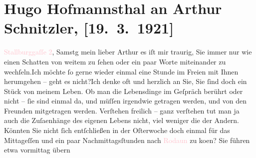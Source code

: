 

               \section[Hugo Hofmannsthal an Arthur Schnitzler, {[}19. 3. 1921{]}]{ Hugo Hofmannsthal an Arthur Schnitzler, {[}19. 3. 1921{]}}\nopagebreak{}\rehead{ }\normalsize\beginnumbering{} \toendnotes[C]{\smallbreak\pagebreak[2]} 
\toendnotes[C]{\smallbreak}\pstart
           \raggedleft{}{\pb}\textcolor{pink}{Stallburggaſſe 2}{}\ledrightnote{\textcolor{pink}{Stallburggasse}}, Samstg\pend
           \pstart{}mein lieber Arthur\pend\pstart
           es iſt mir traurig, Sie immer nur wie einen Schatten von weitem zu ſehen oder ein
               paar Worte miteinander zu wechſeln.\hspace*{1.5em}Ich möchte ſo
               gerne wieder einmal eine Stunde im Freien mit Ihnen herumgehen – geht es nicht?\hspace*{1.5em}Ich denke oft und herzlich an Sie, Sie ſind doch ein
               Stück von meinem Leben. Ob man die Lebensdinge im Geſpräch berührt oder nicht – ſie
               sind einmal {\pb}da, und müſſen
               irgendwie getragen werden, und von den Freunden mitgetragen werden.\pend
           \pstart
           Verſtehen freilich – ganz verſtehen tut man ja auch die Zuſa{\geminationm}enhänge des eigenen Lebens nicht, viel weniger die der
               Andern.\pend
           \pstart
           Könnten Sie nicht ſich entſchließen in der Oſterwoche doch einmal für
               das Mittageſſen und ein paar Nachmittagsſtunden nach \textcolor{pink}{Rodaun}{}\ledrightnote{\textcolor{pink}{Rodaun}} zu ko{\geminationm}en? {\pb}Sie führen etwa vormittag übern
